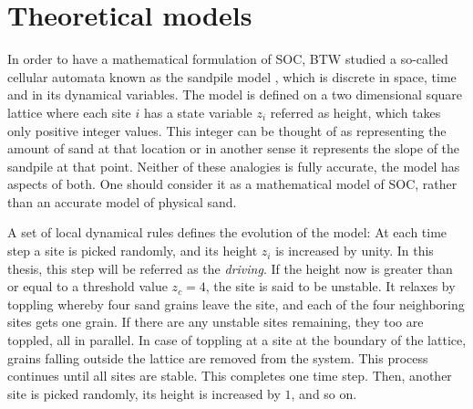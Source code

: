\documentclass[11pt,a4paper]{book}
\begin{document}
\section{Theoretical models}
In order to have a mathematical formulation of SOC,
BTW studied a so-called cellular automata known
as the sandpile model \cite{btw}, which is discrete in space, time and in its
dynamical variables. The model is defined on a two dimensional square
lattice where each site $i$ has a state variable $z_{i}$ referred as
height, which takes only positive integer values. This integer can be thought
of as representing the amount of sand at that location
or in another
sense it represents the slope of the sandpile at that point. Neither
of these analogies is fully accurate, the model has aspects of both.
One should consider it as a mathematical model of SOC, rather than an
accurate model of physical sand.

A set of local dynamical rules defines the evolution of the model: At each time
step a site is picked randomly, and its height $z_{i}$ is increased by
unity. In this thesis, this step will be referred as the
\textit{driving}. If the height now is greater than or equal to a threshold value
$z_{c}=4$, the site is said to be unstable. It relaxes by toppling
whereby four sand grains leave the site, and each of the four
neighboring sites gets one grain. If there are any unstable sites
remaining, they too are toppled, all in parallel. In case of toppling at a site at the
boundary of the lattice, grains falling outside the lattice are
removed from the system. This process continues until all sites are
stable. This completes one time step. Then, another site is picked randomly, its height is increased by
$1$, and so on.
\end{document}
